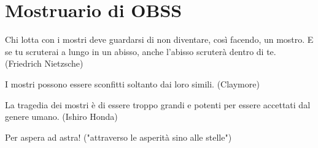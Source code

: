\section{Mostruario di OBSS}

\begin{changemargin}{0.3cm}{0.3cm}\begin{enfasi}{Chi lotta con i mostri deve guardarsi di non diventare, così facendo, un mostro. E se tu scruterai a lungo in un abisso, anche l'abisso scruterà dentro di te. (Friedrich Nietzsche)

\medskip

I mostri possono essere sconfitti soltanto dai loro simili. (Claymore)

\medskip

La tragedia dei mostri è di essere troppo grandi e potenti per essere accettati dal genere umano. (Ishiro Honda)

\medskip

Per aspera ad astra! ("attraverso le asperità sino alle stelle")

}\end{enfasi}\end{changemargin}\medskip

